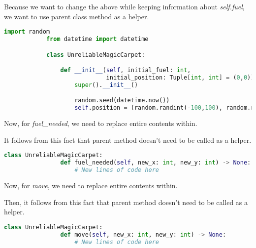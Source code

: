 \documentclass[12pt]{article}
\begin{document}
\begin{itemize}
\begin{enumerate}[a.]
\begin{mdframed}
            \bigskip

            Because we want to change the above while keeping information about \textit{self.fuel},
            we want to use parent class method as a helper.

            \bigskip

            \begin{lstlisting}[language=Python]
            import random
            from datetime import datetime

            class UnreliableMagicCarpet:

                def __init__(self, initial_fuel: int,
                             initial_position: Tuple[int, int] = (0,0)) -> None:
                    super().__init__()

                    random.seed(datetime.now())
                    self.position = (random.randint(-100,100), random.randint(-100,100))

            \end{lstlisting}

            \color{red}
            Now, for \textit{fuel\_needed}, we need to replace entire contents within.

            \bigskip

            It follows from this fact that parent method doesn't need to be
            called as a helper.
            \color{black}

            \bigskip

            \begin{lstlisting}[language=Python]
            class UnreliableMagicCarpet:
                def fuel_needed(self, new_x: int, new_y: int) -> None:
                    # New lines of code here

            \end{lstlisting}

            \bigskip

            Now, for \textit{move}, we need to replace entire contents within.

            \bigskip

            Then, it follows from this fact that parent method doesn't need to be
            called as a helper.

            \bigskip

            \begin{lstlisting}[language=Python]
            class UnreliableMagicCarpet:
                def move(self, new_x: int, new_y: int) -> None:
                    # New lines of code here

            \end{lstlisting}
        \end{mdframed}

    \end{enumerate}
\end{itemize}
\end{document}
